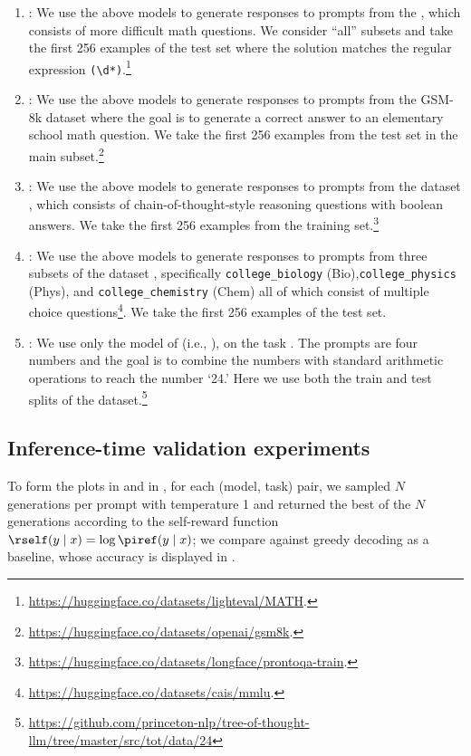 {\begin{enumerate}
    \item \mathdataset: We use the above models to generate responses to prompts from the \mathdataset \citep{hendrycks2021measuring}, which consists of more difficult math questions.  We consider ``all'' subsets and take the first 256 examples of the test set where the solution matches the regular expression \verb|(\d*)|.\footnote{\url{https://huggingface.co/datasets/lighteval/MATH}.}  %
    \item \gsm: We use the above models to generate responses to prompts from the GSM-8k dataset \citep{cobbe2021training} where the goal is to generate a correct answer to an elementary school math question. We take the first 256 examples from the test set in the main subset.\footnote{\url{https://huggingface.co/datasets/openai/gsm8k}.} %
    \item \prontoqa: We use the above models to generate responses to prompts from the \prontoqa dataset \citep{saparov2023language}, which consists of chain-of-thought-style reasoning questions with boolean answers.  We take the first 256 examples from the training set.\footnote{\url{https://huggingface.co/datasets/longface/prontoqa-train}.} %
    \item \mmlu: We use the above models to generate responses to prompts from three subsets of the \mmlu dataset \citep{hendrycks2020measuring}, specifically \texttt{college\_biology} (Bio),\texttt{college\_physics} (Phys), and \texttt{college\_chemistry} (Chem) all of which consist of multiple choice questions\footnote{\url{https://huggingface.co/datasets/cais/mmlu}.}. We take the first 256 examples of the test set. 
    \item \gametwentyfour: We use only the model of \iftoggle{workshop}{\cite{wan2024alphazero}}{\citet{wan2024alphazero}} (i.e., \llamagame), on the \gametwentyfour task \citep{yao2024tree}.  The prompts are four numbers and the goal is to combine the numbers with standard arithmetic operations to reach the number `24.'  Here we use both the train and test splits of the dataset.\footnote{\url{https://github.com/princeton-nlp/tree-of-thought-llm/tree/master/src/tot/data/24}}  %
\end{enumerate}

\subsection{Inference-time validation experiments}\label{ssec:inference}
To form the plots in  and in , for each (model, task) pair, we sampled $N$ generations per prompt with temperature 1 and returned the best of the $N$ generations according to the \mlsharp self-reward function $\rself(y\mid{}x)=\log\piref(y\mid{}x)$; we compare against greedy decoding as a baseline, whose accuracy is displayed in .  

}
